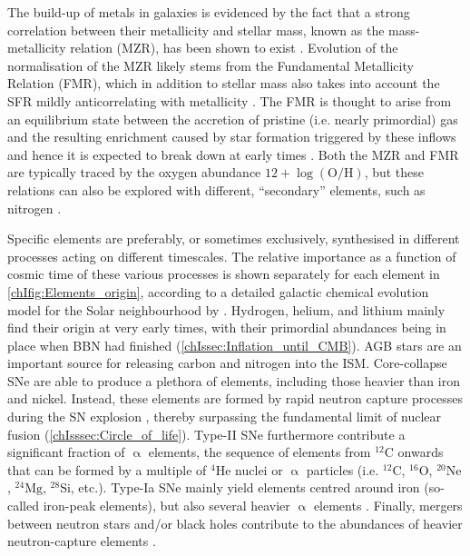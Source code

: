 The build-up of metals in galaxies is evidenced by the fact that a strong correlation between their metallicity and stellar mass, known as the mass-metallicity relation (MZR), has been shown to exist \citep[at least at late times, $z \lesssim 3$;][]{2008A&A...488..463M}. Evolution of the normalisation of the MZR likely stems from the Fundamental Metallicity Relation (FMR), which in addition to stellar mass also takes into account the SFR mildly anticorrelating with metallicity \citep{2010MNRAS.408.2115M}. The FMR is thought to arise from an equilibrium state between the accretion of pristine (i.e. nearly primordial) gas and the resulting enrichment caused by star formation triggered by these inflows \citep{2020MNRAS.491..944C} and hence it is expected to break down at early times \citep[e.g.][]{2022arXiv220712375C}. Both the MZR and FMR are typically traced by the oxygen abundance $12 + \log \left( \mathrm{O/H} \right)$, but these relations can also be explored with different, ``secondary'' elements, such as nitrogen \citep[whose production rate is dependent on the metallicity itself; e.g.][]{2022MNRAS.512.2867H}.

Specific elements are preferably, or sometimes exclusively, synthesised in different processes acting on different timescales. The relative importance as a function of cosmic time of these various processes is shown separately for each element in \cref{chIfig:Elements_origin}, according to a detailed galactic chemical evolution model for the Solar neighbourhood by \citet{2020ApJ...900..179K}. Hydrogen, helium, and lithium mainly find their origin at very early times, with their primordial abundances being in place when BBN had finished (\cref{chIssec:Inflation_until_CMB}). AGB stars are an important source for releasing carbon and nitrogen into the ISM. Core-collapse SNe are able to produce a plethora of elements, including those heavier than iron and nickel. Instead, these elements are formed by rapid neutron capture processes during the SN explosion \citep{2010gfe..book.....M}, thereby surpassing the fundamental limit of nuclear fusion (\cref{chIsssec:Circle_of_life}). Type-II SNe furthermore contribute a significant fraction of $\upalpha$ elements, the sequence of elements from $^{12}\text{C}$ onwards that can be formed by a multiple of $^{4}\text{He}$ nuclei or $\upalpha$ particles (i.e. $^{12}\text{C}$, $^{16}\text{O}$, $^{20}\text{Ne}$, $^{24}\text{Mg}$, $^{28}\text{Si}$, etc.). Type-Ia SNe mainly yield elements centred around iron (so-called iron-peak elements), but also several heavier $\upalpha$ elements . Finally, mergers between neutron stars and/or black holes contribute to the abundances of heavier neutron-capture elements \citep{2017Natur.551...75S}.

